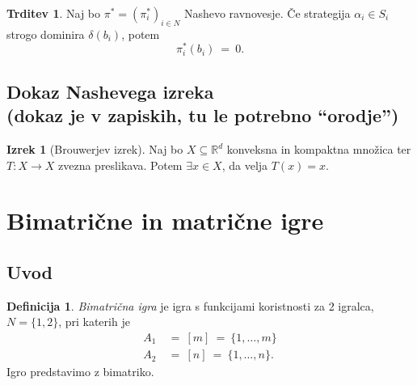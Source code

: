 \documentclass[11pt]{article}
\newcommand{\R}{\mathbb{R}}
\newcommand{\set}[1]{\{#1\}}
\newcommand{\1}{\mathbbm{1}}
\theoremstyle{definition}
\newtheorem{definicija}{Definicija}[section]
\theoremstyle{definition}
\newtheorem{trditev}{Trditev}[section]
\theoremstyle{definition}
\newtheorem{izrek}{Izrek}[section]
\theoremstyle{definition}
\begin{document}
\begin{trditev}

Naj bo $\pi^* = (\pi_i^*)_{i \in N}$ Nashevo ravnovesje. Če strategija \hbox{$\alpha_i \in S_i$} strogo dominira $\delta(b_i)$, potem 
$$\pi_i^*(b_i) ~=~ 0.$$

\end{trditev}
\vspace{0.5cm}


\subsection{Dokaz Nashevega izreka \\(dokaz je v zapiskih, tu le potrebno ``orodje'')}
\vspace{0.5cm}

\begin{izrek}[Brouwerjev izrek]

Naj bo $X \subseteq \R^d$ konveksna in kompaktna množica ter $T: X \rightarrow X$ zvezna preslikava. Potem $\exists x \in X$, da velja \hbox{$T(x) = x$}.

\end{izrek}
\vspace{0.5cm}

\pagebreak


\section{Bimatrične in matrične igre}
\vspace{0.5cm}


\subsection{Uvod}
\vspace{0.5cm}

\begin{definicija}

\textit{Bimatrična igra} je igra s funkcijami koristnosti za 2 igralca, $N = \set{1,2}$, pri katerih je
\begin{align*}
A_1 ~&=~ [m] ~=~ \set{1,\ldots,m} \\
A_2 ~&=~ [n] ~=~ \set{1,\ldots,n}.
\end{align*}
Igro predstavimo z bimatriko.

\end{definicija}
\vspace{0.5cm}
\end{document}
